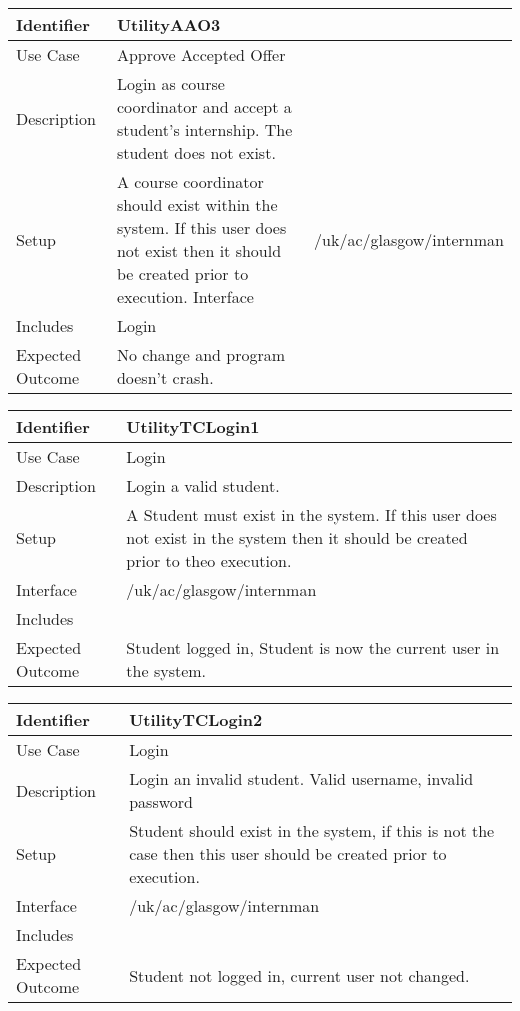 \begin{tabularx}{\textwidth}{|T|L|}
\hline
Identifier & UtilityAAO3\\
\hline
Use Case & Approve Accepted Offer \\
\hline
Description & Login as course coordinator and accept a student's internship.
The student does not exist.\\
\hline
Setup & A course coordinator should exist within the system. If this
user does not exist then it should be created prior to execution.
\hline
Interface & /uk/ac/glasgow/internman \\
\hline
Includes & Login \\
\hline
Expected Outcome & No change and program doesn't crash.\\
\hline
\end{tabularx}

\vspace{2em}

\begin{tabularx}{\textwidth}{|T|L|}
\hline
Identifier & UtilityTCLogin1\\
\hline
Use Case & Login\\
\hline
Description & Login a valid student. \\
\hline
Setup & A Student must exist in the system. If this user does not
exist in the system then it should be created prior to theo execution. \\
\hline
Interface & /uk/ac/glasgow/internman \\
\hline
Includes & \\
\hline
Expected Outcome & Student logged in, Student is now the current user
in the system.\\
\hline
\end{tabularx}

\vspace{2em}

\begin{tabularx}{\textwidth}{|T|L|}
\hline
Identifier & UtilityTCLogin2\\
\hline
Use Case & Login \\
\hline
Description & Login an invalid student. Valid username, invalid password\\
\hline
Setup & Student should exist in the system, if this is not the case
then this user should be created prior to execution.\\
\hline
Interface & /uk/ac/glasgow/internman \\
\hline
Includes & \\
\hline
Expected Outcome & Student not logged in, current user not changed.\\
\hline
\end{tabularx}

